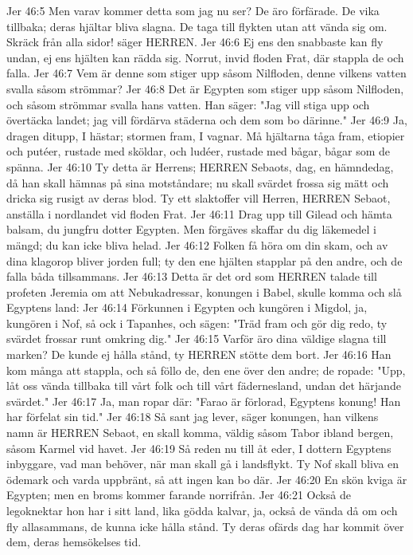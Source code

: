 Jer 46:5  Men varav kommer detta som jag nu ser? De äro förfärade. De vika tillbaka; deras hjältar bliva slagna. De taga till flykten utan att vända sig om. Skräck från alla sidor! säger HERREN.
Jer 46:6  Ej ens den snabbaste kan fly undan, ej ens hjälten kan rädda sig. Norrut, invid floden Frat, där stappla de och falla.
Jer 46:7  Vem är denne som stiger upp såsom Nilfloden, denne vilkens vatten svalla såsom strömmar?
Jer 46:8  Det är Egypten som stiger upp såsom Nilfloden, och såsom strömmar svalla hans vatten. Han säger: "Jag vill stiga upp och övertäcka landet; jag vill fördärva städerna och dem som bo därinne."
Jer 46:9  Ja, dragen ditupp, I hästar; stormen fram, I vagnar. Må hjältarna tåga fram, etiopier och putéer, rustade med sköldar, och ludéer, rustade med bågar, bågar som de spänna.
Jer 46:10  Ty detta är Herrens; HERREN Sebaots, dag, en hämndedag, då han skall hämnas på sina motståndare; nu skall svärdet frossa sig mätt och dricka sig rusigt av deras blod. Ty ett slaktoffer vill Herren, HERREN Sebaot, anställa i nordlandet vid floden Frat.
Jer 46:11  Drag upp till Gilead och hämta balsam, du jungfru dotter Egypten. Men förgäves skaffar du dig läkemedel i mängd; du kan icke bliva helad.
Jer 46:12  Folken få höra om din skam, och av dina klagorop bliver jorden full; ty den ene hjälten stapplar på den andre, och de falla båda tillsammans.
Jer 46:13  Detta är det ord som HERREN talade till profeten Jeremia om att Nebukadressar, konungen i Babel, skulle komma och slå Egyptens land:
Jer 46:14  Förkunnen i Egypten och kungören i Migdol, ja, kungören i Nof, så ock i Tapanhes, och sägen: "Träd fram och gör dig redo, ty svärdet frossar runt omkring dig."
Jer 46:15  Varför äro dina väldige slagna till marken? De kunde ej hålla stånd, ty HERREN stötte dem bort.
Jer 46:16  Han kom många att stappla, och så föllo de, den ene över den andre; de ropade: "Upp, låt oss vända tillbaka till vårt folk och till vårt fädernesland, undan det härjande svärdet."
Jer 46:17  Ja, man ropar där: "Farao är förlorad, Egyptens konung! Han har förfelat sin tid."
Jer 46:18  Så sant jag lever, säger konungen, han vilkens namn är HERREN Sebaot, en skall komma, väldig såsom Tabor ibland bergen, såsom Karmel vid havet.
Jer 46:19  Så reden nu till åt eder, I dottern Egyptens inbyggare, vad man behöver, när man skall gå i landsflykt. Ty Nof skall bliva en ödemark och varda uppbränt, så att ingen kan bo där.
Jer 46:20  En skön kviga är Egypten; men en broms kommer farande norrifrån.
Jer 46:21  Också de legoknektar hon har i sitt land, lika gödda kalvar, ja, också de vända då om och fly allasammans, de kunna icke hålla stånd. Ty deras ofärds dag har kommit över dem, deras hemsökelses tid.
